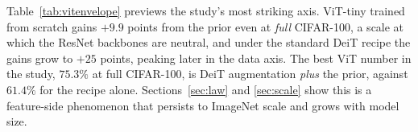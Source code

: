 Table~\ref{tab:vitenvelope} previews the study's most striking axis.
ViT-tiny trained from scratch gains $+9.9$ points from the prior even at
\emph{full} CIFAR-100, a scale at which the ResNet backbones are
neutral, and under the standard DeiT recipe the gains grow to
$+25$ points, peaking later in the data axis. The best ViT number in the
study, $75.3\%$ at full CIFAR-100, is DeiT augmentation \emph{plus} the
prior, against $61.4\%$ for the recipe alone. Sections~\ref{sec:law} and
\ref{sec:scale} show this is a feature-side phenomenon that persists to
ImageNet scale and grows with model size.
